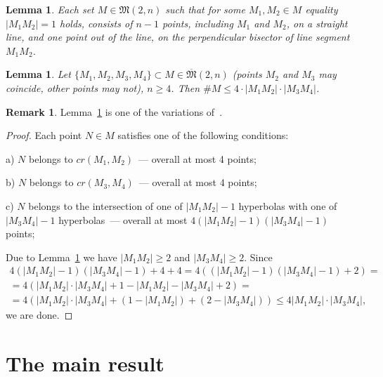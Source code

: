 \documentclass[a4paper,14pt]{article} %
\theoremstyle{plain}
\newtheorem{lemma}[theorem]{Lemma}
\theoremstyle{definition}
\newtheorem{remark}[theorem]{Remark}
\begin{document}
\begin{lemma}
	\cite[Theorem 3.10]{my-pps-linear-bound-2019}
	\label{lem:no_distance_one}
	Each set $M\in\mathfrak{M}(2,n)$
	such that for some $M_1,M_2 \in M$ equality $|M_1 M_2|=1$ holds,
	consists of $n-1$ points, including $M_1$ and $M_2$, on a straight line,
	and one point out of the line, on the perpendicular bisector of line segment $M_1 M_2$.
\end{lemma}


\begin{lemma}
	\label{lem:count_of_points_on_hyperbolas}
	Let $\{M_1, M_2, M_3, M_4\} \subset M\in\overline{\mathfrak{M}}(2,n)$
	(points $M_2$ and $M_3$ may coincide, other points may not), $n\geq 4$.
	Then $\# M \leq 4 \cdot |M_1 M_2| \cdot |M_3 M_4|$.
\end{lemma}

\begin{remark}
	Lemma~\ref{lem:count_of_points_on_hyperbolas} is one of the variations of~\cite{erdos1945integral}.
\end{remark}

\begin{proof}
	Each point $N\in M$ satisfies one of the following conditions:

	a) $N$ belongs to $cr(M_1,M_2)$~--- overall at most 4 points;

	b) $N$ belongs to $cr(M_3,M_4)$~--- overall at most 4 points;

	c) $N$ belongs to the intersection of one of $|M_1 M_2| - 1$ hyperbolas
	with one of $|M_3 M_4| - 1$ hyperbolas~--- overall at most $4 (|M_1 M_2| - 1)(|M_3 M_4| - 1)$ points;

	Due to Lemma~\ref{lem:no_distance_one} we have $|M_1 M_2| \geq 2$ and $|M_3 M_4| \geq 2$.
	Since
	\begin{multline}
		4 (|M_1 M_2| - 1)(|M_3 M_4| - 1) + 4 + 4
		=
		4 ( (|M_1 M_2| - 1)(|M_3 M_4| - 1) + 2)
		=
		\\=
		4 ( |M_1 M_2| \cdot |M_3 M_4| + 1 - |M_1 M_2| - |M_3 M_4| + 2)
		=
		\\=
		4 ( |M_1 M_2| \cdot |M_3 M_4| + (1 - |M_1 M_2|) + (2 - |M_3 M_4|))
		\leq
		4 |M_1 M_2| \cdot |M_3 M_4|
		,
	\end{multline}
	we are done.
\end{proof}


\section{The main result}
\end{document}
